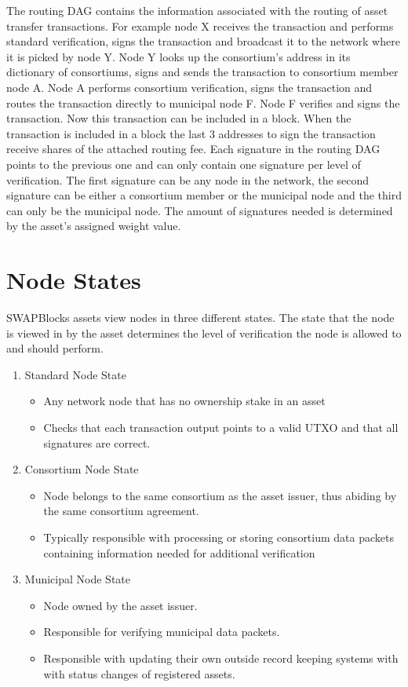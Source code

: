 \documentclass[12pt]{article}
\begin{document}
The routing DAG contains the information associated with the routing of asset 
transfer transactions.  For example node X receives the transaction and performs standard 
verification, signs the transaction and broadcast it to the network where it is picked
by node Y. Node Y looks up the consortium's address in its dictionary of 
consortiums, signs and sends the transaction to consortium member node A. Node A performs 
consortium verification, signs the transaction and routes the transaction directly to 
municipal node F.  Node F verifies and signs the transaction. 
Now this transaction can be included in a block.  When the 
transaction is included in a block the last 3 addresses to sign the transaction 
receive shares of the attached routing fee.  Each signature in the routing DAG points 
to the previous one and can only contain one signature per level of verification.  
The first signature can be any node in the network, 
the second signature can be either a consortium member or the municipal node 
and the third can only be the municipal node.  The amount of signatures needed 
is determined by the asset's assigned weight value. 




\section{Node States}

SWAPBlocks assets view nodes in three different states. The state that the node is viewed in 
by the asset determines the level of verification the node is allowed to and should
perform.


\begin{enumerate}
	\item Standard Node State
		\begin{itemize}
			\item{Any network node that has no ownership stake in an asset}
			\item{Checks that each transaction output points to a valid UTXO
				and that all signatures are correct.}
		\end{itemize}
	\item Consortium Node State
		\begin{itemize}
			\item{Node belongs to the same consortium as the asset issuer,
				thus abiding by the same consortium agreement.}
			\item{Typically responsible with processing  or storing
				consortium data packets containing information 
				needed for additional verification}
		\end{itemize}
	\item Municipal Node State
		\begin{itemize}
			\item{Node owned by the asset issuer.}
			\item{Responsible for verifying municipal data packets.}
			\item{Responsible with updating their own outside record keeping systems with
				with status changes of registered assets.}	
		\end{itemize}
\end{enumerate}
\end{document}
